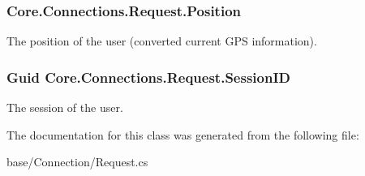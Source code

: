 \subsubsection[{Position}]{ Core.\+Connections.\+Request.\+Position}\label{classCore_1_1Connections_1_1Request_a1aaa165e5028fe5a7baab44d6306cbee}


The position of the user (converted current G\+P\+S information). 

\hypertarget{classCore_1_1Connections_1_1Request_a19082721a0c3785a77691cb3bec7dd42}{}
\subsubsection[{Session\+I\+D}]{\setlength{\rightskip}{0pt plus 5cm}Guid Core.\+Connections.\+Request.\+Session\+I\+D}\label{classCore_1_1Connections_1_1Request_a19082721a0c3785a77691cb3bec7dd42}


The session of the user. 



The documentation for this class was generated from the following file\+:\begin{DoxyCompactItemize}
\item 
base/\+Connection/Request.\+cs\end{DoxyCompactItemize}
